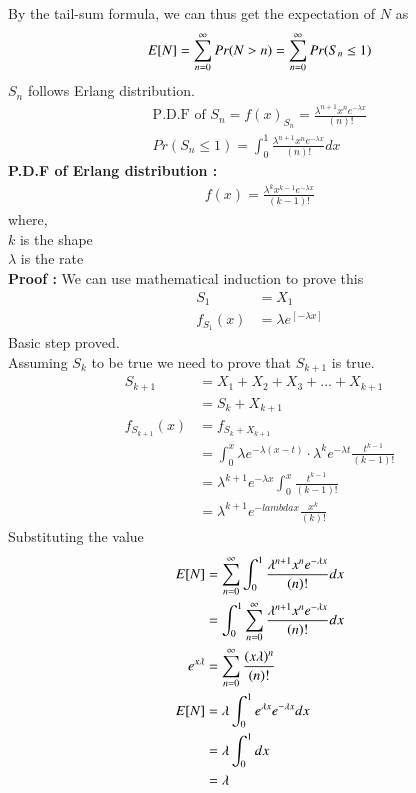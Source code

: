\documentclass[journal,12pt,twocolumn]{IEEEtran}
\begin{document}
By the tail-sum formula, we can thus get the expectation of $N$ as\\
\begin{align}
    E[ N ] = \sum ^\infty _{n = 0} Pr(N > n) = \sum ^\infty _{n = 0} Pr(S_n \leq 1)
\end{align}
$S_n$ follows Erlang distribution.\\
\begin{align}
    \text{P.D.F of }S_n = f(x)_{S_n} = \frac{\lambda^{n+1} x^{n}e^{-\lambda x}}{(n)!}\\
    Pr(S_n \leq 1) = \int _0 ^1 \frac{\lambda^{n+1} x^{n}e^{-\lambda x}}{(n)!} dx
\end{align}
\textbf{P.D.F of Erlang distribution : }\\
\begin{align}
    f(x) = \frac{\lambda^{k} x^{k-1}e^{-\lambda x}}{(k-1)!}
\end{align}
where,\\
$k$ is the shape\\
$\lambda$ is the rate\\
\textbf{Proof : }We can use mathematical induction to prove this\\
\begin{align}
  S_1 &= X_1\\
  f_{S_1}(x) &= \lambda e^{[-\lambda x]}
\end{align}
Basic step proved.\\
Assuming $S_k$ to be true we need to prove that $S_{k+1}$ is true.\\
\begin{align}
    S_{k+1} &= X_1 + X_2 + X_3 + \dots + X_{k+1}\\
    &= S_k + X_{k+1}\\
    f_{S_{k+1}}(x) &= f_{S_k + X_{k+1}}\\
    &= \int _0 ^x \lambda e^{-\lambda(x-t)} \cdot \lambda^k e^{-\lambda t} \frac{t^{k-1}}{(k-1)!}\\
    &= \lambda^{k+1} e^{-\lambda x} \int _0 ^x \frac{t^{k-1}}{(k-1)!}\\
    &= \lambda^{k+1} e^{-lambda x} \frac{x^k}{(k)!}
\end{align}
Substituting the value\\
\begin{align}
    E[ N ] &= \sum _{n = 0} ^\infty \int _0 ^1  \frac{\lambda^{n+1} x^{n}e^{-\lambda x}}{(n)!} dx\\
    &= \int _0 ^1 \sum _{n = 0} ^\infty \frac{\lambda^{n+1} x^{n}e^{-\lambda x}}{(n)!} dx\\
    e^{x\lambda} &= \sum _{n = 0} ^ \infty\frac{(x\lambda)^n}{(n)!}\\
    E[ N ] &=\lambda  \int _0 ^1 e^{\lambda x} e^{-\lambda x} dx\\
    &= \lambda \int _0 ^1 dx\\
    &= \lambda
\end{align}
\end{document}
